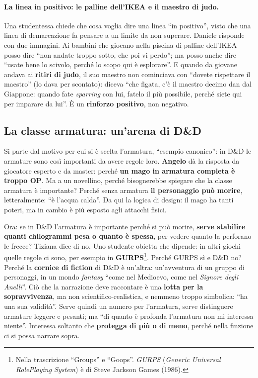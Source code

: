 \paragraph{La linea in positivo: le palline dell'IKEA e il maestro di judo.} Una studentessa chiede
che cosa voglia dire una linea ``in positivo'', visto che una linea di demarcazione fa pensare a un
limite da non superare. Daniele risponde con due immagini. Ai bambini che giocano nella piscina di
palline dell'IKEA posso dire ``non andate troppo sotto, che poi vi perdo''; ma posso anche dire
``usate bene lo scivolo, perché lo scopo qui è esplorare''. E quando da giovane andava ai
\textbf{ritiri di judo}, il suo maestro non cominciava con ``dovete rispettare il maestro'' (lo
dava per scontato): diceva ``che figata, c'è il maestro decimo dan dal Giappone: quando fate
\emph{sparring} con lui, fatelo il più possibile, perché siete qui per imparare da lui''. È un
\textbf{rinforzo positivo}, non negativo.

\subsection{La classe armatura: un'arena di D\&D}

Si parte dal motivo per cui si è scelta l'armatura, ``esempio canonico'': in D\&D le armature
sono così importanti da avere regole loro. \textbf{Angelo} dà la risposta da giocatore esperto e
da master: perché \textbf{un mago in armatura completa è troppo OP}. Ma a un novellino, perché
bisognerebbe spiegare che la classe armatura è importante? Perché senza armatura \textbf{il
personaggio può morire}, letteralmente: ``è l'acqua calda''. Da qui la logica di design: il mago ha
tanti poteri, ma in cambio è più esposto agli attacchi fisici.

Ora: se in D\&D l'armatura è importante perché si può morire, \textbf{serve stabilire quanti
chilogrammi pesa o quanto è spessa}, per vedere quanto la perforano le frecce? Tiziana dice di no.
Uno studente obietta che dipende: in altri giochi quelle regole ci sono, per esempio in
\textbf{GURPS}\footnote{Nella trascrizione ``Groups'' e ``Goops''. \emph{GURPS} (\emph{Generic
Universal RolePlaying System}) è di Steve Jackson Games (1986).}. Perché GURPS sì e D\&D no?
Perché la \textbf{cornice di fiction} di D\&D è un'altra: un'avventura di un gruppo di personaggi,
in un mondo \emph{fantasy} ``come nel Medioevo, come nel \emph{Signore degli Anelli}''. Ciò che la
narrazione deve raccontare è una \textbf{lotta per la sopravvivenza}, ma non scientifico-realistica,
e nemmeno troppo simbolica: ``ha una sua validità''. Serve quindi un numero per l'armatura, serve
distinguere armature leggere e pesanti; ma ``di quanto è profonda l'armatura non mi interessa
niente''. Interessa soltanto che \textbf{protegga di più o di meno}, perché nella finzione ci si
possa narrare sopra.

